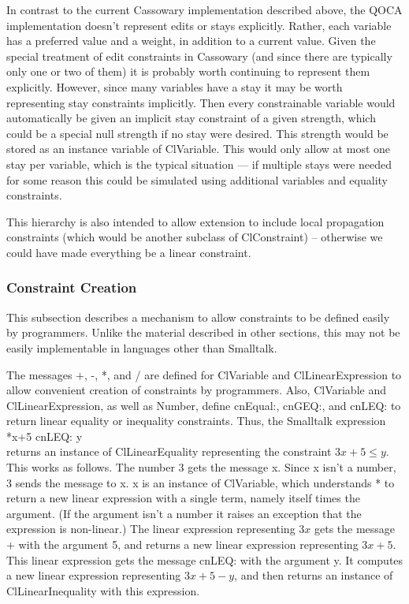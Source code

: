 \documentclass{article}
\begin{document}
In contrast to the current Cassowary implementation described above, the
QOCA implementation doesn't represent edits or stays explicitly.  Rather,
each variable has a preferred value and a weight, in addition to a current
value.  Given the special treatment of edit constraints in Cassowary (and
since there are typically only one or two of them) it is probably worth
continuing to represent them explicitly.  However, since many variables
have a stay it may be worth representing stay constraints implicitly.  Then
every constrainable variable would automatically be given an implicit stay
constraint of a given strength, which could be a special null strength if
no stay were desired.  This strength would be stored as an instance
variable of {\sf ClVariable}.  This would only allow at most one stay per
variable, which is the typical situation --- if multiple stays were needed
for some reason this could be simulated using additional variables and
equality constraints.

This hierarchy is also intended to allow extension to include local
propagation constraints (which would be another subclass of {\sf
ClConstraint}) -- otherwise we could have made everything be a linear
constraint. 

\subsubsection{Constraint Creation}
\label{constraint-creation}

This subsection describes a mechanism to allow constraints to be defined
easily by programmers.  Unlike the material described in other sections,
this may not be easily implementable in languages other than Smalltalk. 

The messages +, -, *, and / are defined for {\sf ClVariable} and {\sf
ClLinearExpression} to allow convenient creation of constraints by
programmers.  Also, {\sf ClVariable} and {\sf
ClLinearExpression}, as well as {\sf Number}, define {\sf cnEqual:}, {\sf
cnGEQ:}, and {\sf cnLEQ:} to return linear equality or inequality
constraints.  Thus, the Smalltalk expression \\
\hspace*{1cm} {*x+5 cnLEQ: y} \\
returns an instance of {\sf ClLinearEquality} representing the constraint 
$3 x + 5 \leq y$.  
This works as follows.  The number 3 gets the message {\sf * x}.  Since
{\sf x} isn't a number, 3 sends the message {} to {\sf x}.  {\sf x}
is an instance of {\sf ClVariable}, which understands * to return a new
linear expression with a single term, namely itself times the argument.
(If the argument isn't a number it raises an exception that the expression
is non-linear.)  The linear expression representing $3x$ gets the message +
with the argument 5, and returns a new linear expression representing $3 x
+ 5$.  This linear expression gets the message {\sf cnLEQ:} with the
argument {\sf y}.  It computes a new linear expression representing 
$3 x + 5 - y$, and then returns an instance of {\sf ClLinearInequality} 
with this expression.
\end{document}
